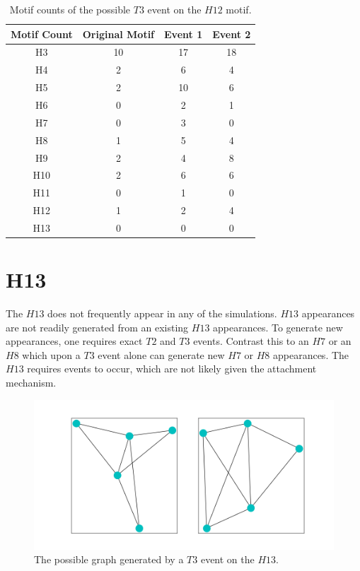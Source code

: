 \begin{table}
    \centering
    \begin{tabular}{||c c c c||} 
    \hline
    Motif Count & Original Motif & Event 1 & Event 2\\ [0.5ex] 
    \hline\hline
    H3 & 10 & 17 & 18 \\ 
    \hline
    H4 & 2 & 6 & 4 \\
    \hline
    H5 & 2 & 10 & 6\\
    \hline
    H6 & 0 & 2 & 1 \\
    \hline
    H7 & 0 & 3 & 0\\
    \hline
    H8 & 1 & 5 & 4 \\
    \hline
    H9 & 2 & 4 & 8 \\
    \hline
    H10 & 2 & 6 & 6 \\
    \hline
    H11 & 0 & 1 & 0 \\
    \hline
    H12 & 1 & 2 & 4 \\
    \hline
    H13 & 0 & 0 & 0\\
    \hline
   \end{tabular}
   \caption{Motif counts of the possible $T3$ event on the $H12$ motif.}
   \label{table:H13T3}
\end{table}

\section{H13}
The $H13$ does not frequently appear in any of the simulations. $H13$ appearances
are not readily generated from an existing $H13$ appearances. To generate new appearances,
one requires exact $T2$ and $T3$ events. Contrast this to an $H7$
or an $H8$ which upon a $T3$ event alone can generate new $H7$ or $H8$ appearances. The $H13$
requires events to occur, which are not likely given the attachment mechanism. 

\begin{figure}
    \includegraphics[width=12cm]{Images/H13_T3_evolution.png}
    \centering
    \caption{The possible graph generated by a $T3$ event on the $H13$.}
\end{figure}

